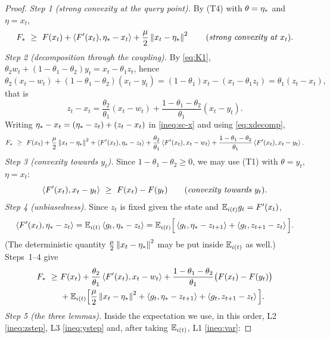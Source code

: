 \begin{proof}
\emph{Step 1 (strong convexity at the query point).} By (T4) with $\theta=\eta_\ast$ and $\eta=x_t$,
\begin{equation}\label{ineq:sc-x}
F_\ast\ \ge\ F(x_t)+\inner{\Fp(x_t)}{\etastar-x_t}+\frac\mu2\norm{x_t-\etastar}^2
\qquad\text{(\emph{strong convexity at $x_t$}).}
\end{equation}
\emph{Step 2 (decomposition through the coupling).} By \eqref{eq:K1}, $\theta_2w_t+(1-\theta_1-\theta_2)y_t=x_t-\theta_1z_t$, hence
\begin{equation*}
\theta_2(x_t-w_t)+(1-\theta_1-\theta_2)(x_t-y_t)=(1-\theta_1)x_t-(x_t-\theta_1z_t)=\theta_1(z_t-x_t),
\end{equation*}
that is
\begin{equation}\label{eq:xdecomp}
z_t-x_t=\frac{\theta_2}{\theta_1}(x_t-w_t)+\frac{1-\theta_1-\theta_2}{\theta_1}(x_t-y_t).
\end{equation}
Writing $\eta_\ast-x_t=(\eta_\ast-z_t)+(z_t-x_t)$ in \eqref{ineq:sc-x} and using \eqref{eq:xdecomp},
\begin{equation*}
F_\ast\ \ge\ F(x_t)+\frac\mu2\norm{x_t-\etastar}^2+\inner{\Fp(x_t)}{\etastar-z_t}+\frac{\theta_2}{\theta_1}\inner{\Fp(x_t)}{x_t-w_t}+\frac{1-\theta_1-\theta_2}{\theta_1}\inner{\Fp(x_t)}{x_t-y_t}.
\end{equation*}
\emph{Step 3 (convexity towards $y_t$).} Since $1-\theta_1-\theta_2\ge0$, we may use (T1) with $\theta=y_t$, $\eta=x_t$:
\begin{equation}\label{ineq:cvx-y}
\inner{\Fp(x_t)}{x_t-y_t}\ \ge\ F(x_t)-F(y_t)\qquad\text{(\emph{convexity towards $y_t$}).}
\end{equation}
\emph{Step 4 (unbiasedness).} Since $z_t$ is fixed given the state and $\mathbb{E}_{i(t)} g_t=F'(x_t)$,
\begin{equation*}
\left\langle F'(x_t), \eta_\ast-z_t \right\rangle=\mathbb{E}_{i(t)}\left\langle g_t, \eta_\ast-z_t \right\rangle=\mathbb{E}_{i(t)}\Big[\left\langle g_t, \eta_\ast-z_{t+1} \right\rangle+\left\langle g_t, z_{t+1}-z_t \right\rangle\Big].
\end{equation*}
(The deterministic quantity $\frac\mu2\left\|x_t-\eta_\ast\right\|^2$ may be put inside $\mathbb{E}_{i(t)}$ as well.) Steps~1--4 give
\begin{align*}
F_\ast\ \ge\ & F(x_t)+\frac{\theta_2}{\theta_1}\left\langle F'(x_t), x_t-w_t \right\rangle+\frac{1-\theta_1-\theta_2}{\theta_1}\big(F(x_t)-F(y_t)\big)\\
&+\mathbb{E}_{i(t)}\Big[\frac\mu2\left\|x_t-\eta_\ast\right\|^2+\left\langle g_t, \eta_\ast-z_{t+1} \right\rangle+\left\langle g_t, z_{t+1}-z_t \right\rangle\Big].
\end{align*}
\emph{Step 5 (the three lemmas).} Inside the expectation we use, in this order, L2 \eqref{ineq:zstep}, L3 \eqref{ineq:ystep} and, after taking $\mathbb{E}_{i(t)}$, L1 \eqref{ineq:var}:

\end{proof}
